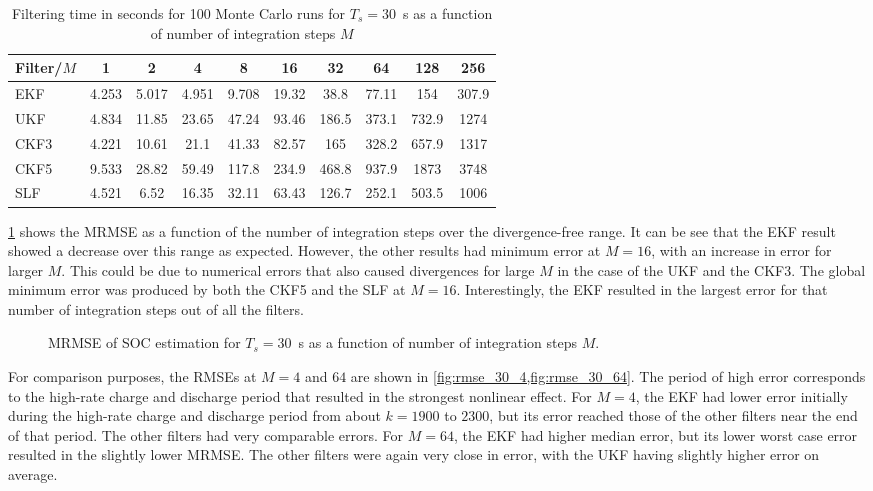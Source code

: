 \documentclass[../zhang_thesis.tex]{subfiles}
\begin{document}
\begin{table}[h]
\centering
\caption{Filtering time in seconds for 100 Monte Carlo runs for $T_s=30$~s as a function of number of integration steps $M$}
\begin{tabular}{@{}lccccccccc@{}}
\toprule
Filter/$M$ & 1     & 2     & 4     & 8     & 16    & 32    & 64    & 128   & 256   \\ \midrule
EKF        & 4.253 & 5.017 & 4.951 & 9.708 & 19.32 & 38.8  & 77.11 & 154   & 307.9 \\
UKF        & 4.834 & 11.85 & 23.65 & 47.24 & 93.46 & 186.5 & 373.1 & 732.9 & 1274  \\
CKF3       & 4.221 & 10.61 & 21.1  & 41.33 & 82.57 & 165   & 328.2 & 657.9 & 1317  \\
CKF5       & 9.533 & 28.82 & 59.49 & 117.8 & 234.9 & 468.8 & 937.9 & 1873  & 3748  \\
SLF        & 4.521 & 6.52  & 16.35 & 32.11 & 63.43 & 126.7 & 252.1 & 503.5 & 1006  \\ \bottomrule
\end{tabular}
\label{tab:time_30}
\end{table}

\cref{fig:mrmse_30} shows the MRMSE as a function of the number of integration steps over the divergence-free range. It can be see that the EKF result showed a decrease over this range as expected. However, the other results had minimum error at $M=16$, with an increase in error for larger $M$. This could be due to numerical errors that also caused divergences for large $M$ in the case of the UKF and the CKF3. The global minimum error was produced by both the CKF5 and the SLF at $M=16$.
Interestingly, the EKF resulted in the largest error for that number of integration steps out of all the filters.

\begin{figure}[ht]
\centering
%
\caption{MRMSE of SOC estimation for $T_s=30$~s as a function of number of integration steps $M$.}
\label{fig:mrmse_30}
\end{figure}

For comparison purposes, the RMSEs at $M=4$ and $64$ are shown in \cref{fig:rmse_30_4,fig:rmse_30_64}. The period of high error corresponds to the high-rate charge and discharge period that resulted in the strongest nonlinear effect. For $M=4$, the EKF had lower error initially during the high-rate charge and discharge period from about $k=1900$ to $2300$, but its error reached those of the other filters near the end of that period. The other filters had very comparable errors. For $M=64$, the EKF
had higher median error, but its lower worst case error resulted in the slightly lower MRMSE. The other filters were again very close in error, with the UKF having slightly higher error on average.
\end{document}
